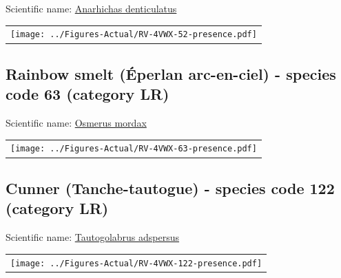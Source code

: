 \documentclass[12pt]{article}\usepackage[]{graphicx}\usepackage[]{color}
\begin{document}
Scientific name: \href{http://www.marinespecies.org/aphia.php?p=taxdetails\&id=126757}{Anarhichas denticulatus} \newline
\begin{minipage}{1.0\textwidth}
 \begin{tabular}{c}
\texttt{[image: ../Figures-Actual/RV-4VWX-52-presence.pdf]} \\ 
\end{tabular} 
\end{minipage}
\clearpage

\renewcommand\thefigure{\thesubsection\Alph{figure}}

\setcounter{figure}{0}

\hypertarget{sec:63}{%
\subsection{Rainbow smelt (Éperlan arc-en-ciel) - species code 63 (category LR)}\label{sec:63}}

  


Scientific name: \href{http://www.marinespecies.org/aphia.php?p=taxdetails\&id=126737}{Osmerus mordax} \newline
\begin{minipage}{1.0\textwidth}
 \begin{tabular}{c}
\texttt{[image: ../Figures-Actual/RV-4VWX-63-presence.pdf]} \\ 
\end{tabular} 
\end{minipage}
\clearpage

\renewcommand\thefigure{\thesubsection\Alph{figure}}

\setcounter{figure}{0}

\hypertarget{sec:122}{%
\subsection{Cunner (Tanche-tautogue) - species code 122 (category LR)}\label{sec:122}}

  


Scientific name: \href{http://www.marinespecies.org/aphia.php?p=taxdetails\&id=159785}{Tautogolabrus adspersus} \newline
\begin{minipage}{1.0\textwidth}
 \begin{tabular}{c}
\texttt{[image: ../Figures-Actual/RV-4VWX-122-presence.pdf]} \\ 
\end{tabular} 
\end{minipage}
\clearpage
\end{document}
